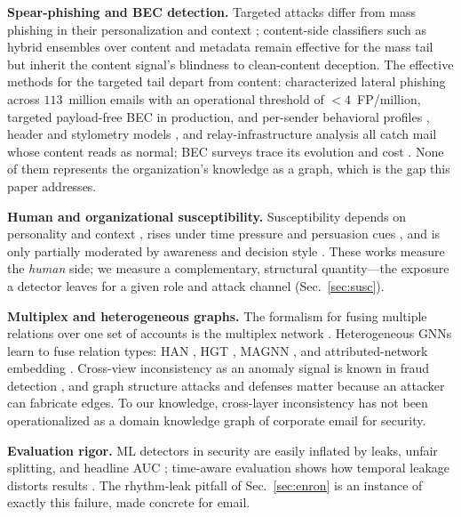 \documentclass[conference]{IEEEtran}
\begin{document}
\textbf{Spear-phishing and BEC detection.} Targeted attacks differ from mass phishing in their
personalization and context \cite{birthriya2025detection}; content-side classifiers such as hybrid ensembles
over content and metadata \cite{bountakas2022helphed} remain effective for the mass tail but inherit the
content signal's blindness to clean-content deception. The effective methods for the targeted tail depart
from content: \cite{ho2019detecting} characterized lateral phishing across $113$~million emails with an
operational threshold of $<\!4$~FP/million, \cite{cidon2019high} targeted payload-free BEC in production, and
per-sender behavioral profiles \cite{gascon2018reading,stringhini2015thataint}, header and stylometry models
\cite{duman2016emailprofiler}, and relay-infrastructure analysis \cite{luo2024characterizing} all catch mail whose
content reads as normal; BEC surveys trace its evolution and cost \cite{atlam2023business}. None of them
represents the organization's knowledge as a graph, which is the gap this paper addresses.

\textbf{Human and organizational susceptibility.} Susceptibility depends on personality and context
\cite{halevi2015spearphishing}, rises under time pressure and persuasion cues \cite{butavicius2022why}, and is only
partially moderated by awareness and decision style \cite{sturman2025security}. These works measure the
\emph{human} side; we measure a complementary, structural quantity---the exposure a detector leaves for a
given role and attack channel (Sec.~\ref{sec:susc}).

\textbf{Multiplex and heterogeneous graphs.} The formalism for fusing multiple relations over one set of
accounts is the multiplex network \cite{kivela2014multilayer,dedomenico2013mathematical,magnani2013combinatorial,jeude2019multilayer}.
Heterogeneous GNNs learn to fuse relation types: HAN \cite{wang2019heterogeneous}, HGT \cite{hu2020heterogeneous},
MAGNN \cite{fu2020magnn}, and attributed-network embedding \cite{christophides2021overview,cen2019representation}.
Cross-view inconsistency as an anomaly signal is known in fraud detection \cite{liu2020alleviating}, and graph
structure attacks \cite{zugner2018adversarial,zugner2019adversarial,dai2022towards} and defenses
\cite{zhang2020gnnguard,jin2020graph,cai2021structural,wang2023label} matter because an attacker can fabricate
edges. To our knowledge, cross-layer inconsistency has not been operationalized as a domain knowledge graph of
corporate email for security.

\textbf{Evaluation rigor.} ML detectors in security are easily inflated by leaks, unfair splitting, and
headline AUC \cite{arp2022dos}; time-aware evaluation shows how temporal leakage distorts results
\cite{pendlebury2019tesseract}. The rhythm-leak pitfall of Sec.~\ref{sec:enron} is an instance of exactly this
failure, made concrete for email.
\end{document}
